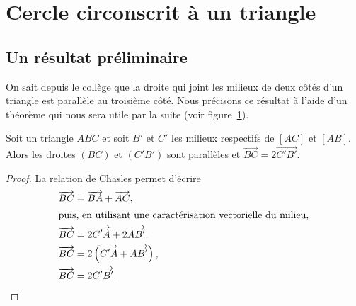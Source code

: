 
\tgoshorttoc
\section{Cercle circonscrit à un triangle}
\subsection{Un résultat préliminaire}
On sait depuis le collège  que la droite qui joint les milieux de deux côtés d'un triangle est parallèle au troisième côté. Nous précisons ce résultat à l'aide d'un théorème qui nous sera utile par la suite (voir figure \ref{figmilieux}).

\begin{figure}[ht]
\centering
{}
\figcaption{}\label{figmilieux}
\end{figure}

\begin{thm}
Soit un triangle $ABC$ et soit $B'$ et $C'$ les milieux respectifs de $[AC]$ et $[AB]$. Alors
les droites $(BC)$ et $(C'B')$ sont parallèles et  $\overrightarrow{BC}=2\overrightarrow{C'B'}$.
\label{thmilieux}
\end{thm}

\begin{proof}
La relation de Chasles permet d'écrire
\begin{align*}
\overrightarrow{BC}&=\overrightarrow{BA}+\overrightarrow{AC},\\
\intertext{puis, en utilisant une caractérisation vectorielle du milieu,}
\overrightarrow{BC}&=2\overrightarrow{C'A}+2\overrightarrow{AB'},\\
\overrightarrow{BC}&=2\left(\overrightarrow{C'A}+\overrightarrow{AB'}\right),\\
\overrightarrow{BC}&=2\overrightarrow{C'B'}.\qedhere
\end{align*}
\end{proof}

